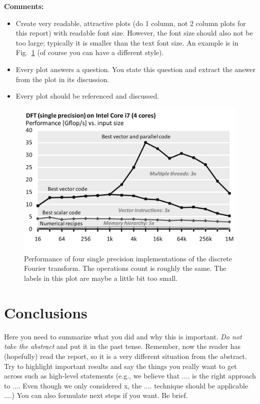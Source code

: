 \documentclass[conference]{IEEEtran}
\begin{document}
{\bf Comments:}
\begin{itemize}
\item Create very readable, attractive plots (do 1 column, not 2 column plots
for this report) with readable font size. However, the font size should also not be too large; typically it is smaller than the text font size.
An example is in Fig.~\ref{fftperf} (of course you can have a different style).
\item Every plot answers a question. You state this question and extract the
answer from the plot in its discussion.
\item Every plot should be referenced and discussed.
\end{itemize}

\begin{figure}\centering
  \includegraphics[scale=0.33]{example-plot}
  \caption{Performance of four single precision implementations of the
  discrete Fourier transform. The operations count is roughly the
  same. The labels in this plot are maybe a little bit too small.\label{fftperf}}
\end{figure}

\section{Conclusions}

Here you need to summarize what you did and why this is
important. {\em Do not take the abstract} and put it in the past
tense. Remember, now the reader has (hopefully) read the report, so it
is a very different situation from the abstract. Try to highlight
important results and say the things you really want to get across
such as high-level statements (e.g., we believe that .... is the right
approach to .... Even though we only considered x, the
.... technique should be applicable ....) You can also formulate next
steps if you want. Be brief. 
\end{document}
